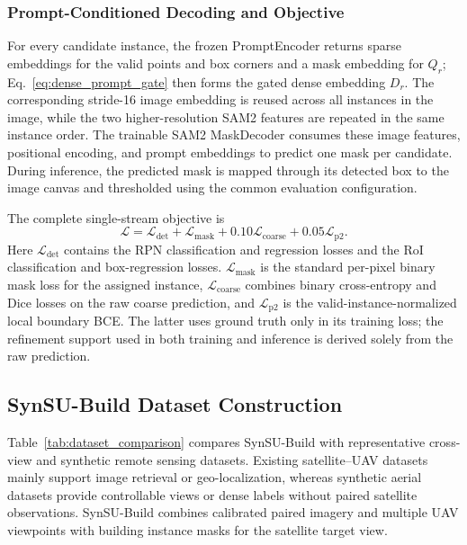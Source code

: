 \documentclass[letterpaper,journal]{IEEEtran}
\begin{document}
\subsubsection{Prompt-Conditioned Decoding and Objective}
For every candidate instance, the frozen PromptEncoder returns sparse embeddings for the valid points and box corners and a mask embedding for $Q_r$; Eq.~\eqref{eq:dense_prompt_gate} then forms the gated dense embedding $D_r$. The corresponding stride-16 image embedding is reused across all instances in the image, while the two higher-resolution SAM2 features are repeated in the same instance order. The trainable SAM2 MaskDecoder consumes these image features, positional encoding, and prompt embeddings to predict one mask per candidate. During inference, the predicted mask is mapped through its detected box to the image canvas and thresholded using the common evaluation configuration.

The complete single-stream objective is
\begin{equation}
\mathcal{L}=\mathcal{L}_{\mathrm{det}}
+\mathcal{L}_{\mathrm{mask}}
+0.10\mathcal{L}_{\mathrm{coarse}}
+0.05\mathcal{L}_{\mathrm{p2}}.
\label{eq:single_loss}
\end{equation}
Here $\mathcal{L}_{\mathrm{det}}$ contains the RPN classification and regression losses and the RoI classification and box-regression losses. $\mathcal{L}_{\mathrm{mask}}$ is the standard per-pixel binary mask loss for the assigned instance, $\mathcal{L}_{\mathrm{coarse}}$ combines binary cross-entropy and Dice losses on the raw coarse prediction, and $\mathcal{L}_{\mathrm{p2}}$ is the valid-instance-normalized local boundary BCE. The latter uses ground truth only in its training loss; the refinement support used in both training and inference is derived solely from the raw prediction.

\subsection{SynSU-Build Dataset Construction}
\label{sec:dataset}

Table~\ref{tab:dataset_comparison} compares SynSU-Build with representative cross-view and synthetic remote sensing datasets. Existing satellite--UAV datasets mainly support image retrieval or geo-localization, whereas synthetic aerial datasets provide controllable views or dense labels without paired satellite observations. SynSU-Build combines calibrated paired imagery and multiple UAV viewpoints with building instance masks for the satellite target view.
\end{document}
